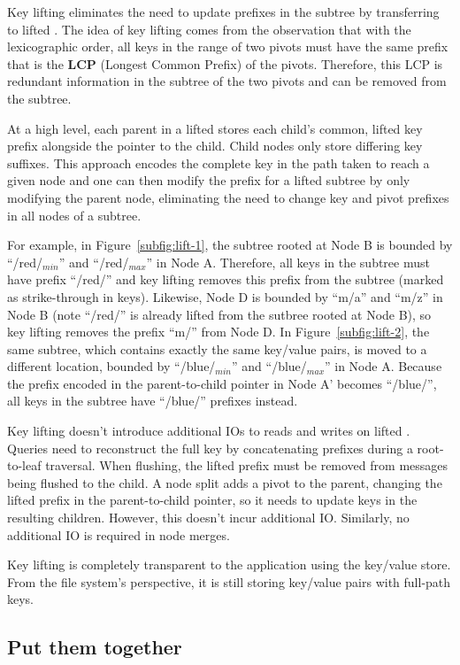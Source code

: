 Key lifting eliminates the need to update prefixes in the subtree by
transferring \bets to lifted \bets.
The idea of key lifting comes from the observation that with the lexicographic
order, all keys in the range of two pivots must have the same prefix that is
the \textbf{LCP} (Longest Common Prefix) of the pivots.
Therefore, this LCP is redundant information in the subtree of the two pivots
and can be removed from the subtree.

At a high level, each parent in a lifted \bet stores each child's common,
lifted key prefix alongside the pointer to the child.
Child nodes only store differing key suffixes.
This approach encodes the complete key in the path taken to reach a given node
and one can then modify the prefix for a lifted subtree by only modifying the
parent node, eliminating the need to change key and pivot prefixes in all nodes
of a subtree.

For example, in Figure~\ref{subfig:lift-1}, the subtree rooted at Node B is
bounded by ``/red/$_{min}$'' and ``/red/$_{max}$'' in Node A.
Therefore, all keys in the subtree must have prefix ``/red/'' and key lifting
removes this prefix from the subtree (marked as strike-through in keys).
Likewise, Node D is bounded by ``m/a'' and ``m/z'' in Node B
(note ``/red/'' is already lifted from the sutbree rooted at Node B),
so key lifting removes the prefix ``m/'' from Node D.
In Figure~\ref{subfig:lift-2}, the same subtree, which contains exactly the
same key/value pairs, is moved to a different location, bounded by
``/blue/$_{min}$'' and ``/blue/$_{max}$'' in Node A.
Because the prefix encoded in the parent-to-child pointer in Node A' becomes
``/blue/'', all keys in the subtree have ``/blue/'' prefixes instead.

Key lifting doesn't introduce additional IOs to reads and writes on lifted
\bets.
Queries need to reconstruct the full key by concatenating prefixes during a
root-to-leaf traversal.
When flushing, the lifted prefix must be removed from messages being flushed
to the child.
A node split adds a pivot to the parent, changing the lifted prefix in the
parent-to-child pointer, so it needs to update keys in the resulting children.
However, this doesn't incur additional IO.
Similarly, no additional IO is required in node merges.

Key lifting is completely transparent to the application using the key/value
store.
From the file system's perspective, it is still storing key/value pairs with
full-path keys.

\subsection{Put them together}

